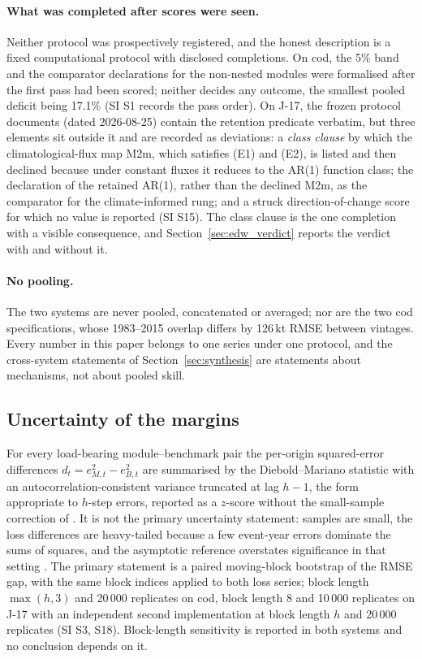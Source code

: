 \paragraph{What was completed after scores were seen.} Neither protocol was prospectively registered, and the honest description is a fixed computational protocol with disclosed completions. On cod, the 5\% band and the comparator declarations for the non-nested modules were formalised after the first pass had been scored; neither decides any outcome, the smallest pooled deficit being 17.1\% (SI S1 records the pass order). On J-17, the frozen protocol documents (dated 2026-08-25) contain the retention predicate verbatim, but three elements sit outside it and are recorded as deviations: a \emph{class clause} by which the climatological-flux map M2m, which satisfies (E1) and (E2), is listed and then declined because under constant fluxes it reduces to the AR(1) function class; the declaration of the retained AR(1), rather than the declined M2m, as the comparator for the climate-informed rung; and a struck direction-of-change score for which no value is reported (SI S15). The class clause is the one completion with a visible consequence, and Section~\ref{sec:edw_verdict} reports the verdict with and without it.

\paragraph{No pooling.} The two systems are never pooled, concatenated or averaged; nor are the two cod specifications, whose 1983--2015 overlap differs by 126\,kt RMSE between vintages. Every number in this paper belongs to one series under one protocol, and the cross-system statements of Section~\ref{sec:synthesis} are statements about mechanisms, not about pooled skill.

\subsection{Uncertainty of the margins}\label{sec:uncertainty}

For every load-bearing module--benchmark pair the per-origin squared-error differences $d_t = e^2_{M,t}-e^2_{B,t}$ are summarised by the Diebold--Mariano statistic \citep{Diebold1995} with an autocorrelation-consistent variance truncated at lag $h-1$, the form appropriate to $h$-step errors, reported as a $z$-score without the small-sample correction of \citet{Harvey1997}. It is not the primary uncertainty statement: samples are small, the loss differences are heavy-tailed because a few event-year errors dominate the sums of squares, and the asymptotic reference overstates significance in that setting \citep{Diebold2015}. The primary statement is a paired moving-block bootstrap \citep{Kunsch1989} of the RMSE gap, with the same block indices applied to both loss series; block length $\max(h,3)$ and 20\,000 replicates on cod, block length 8 and 10\,000 replicates on J-17 with an independent second implementation at block length $h$ and 20\,000 replicates (SI S3, S18). Block-length sensitivity is reported in both systems and no conclusion depends on it.

